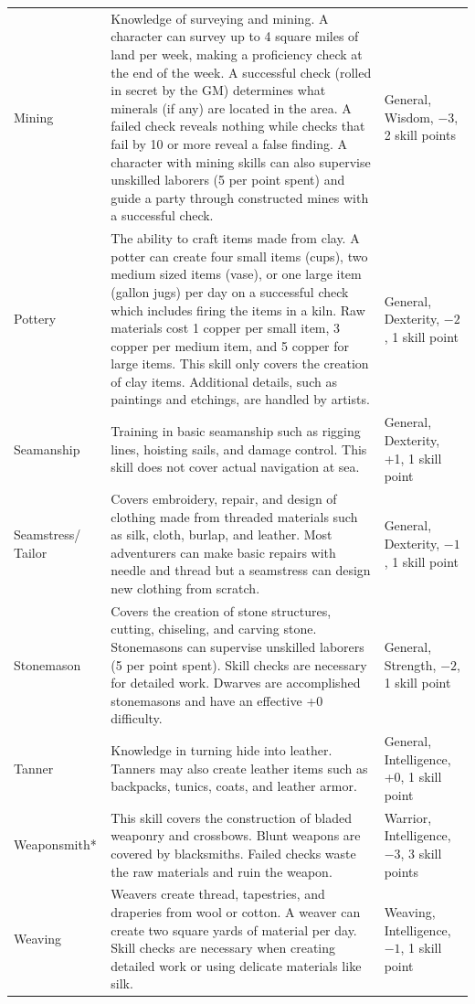\begin{longtable}{|p{}|p{}|p{}|}
\rowcolor[gray]{.9}Mining	& Knowledge of surveying and mining.  A character can survey up to 4 square miles of land per week, making a proficiency check at the end of the week.  A successful check (rolled in secret by the GM) determines what minerals (if any) are located in the area.  A failed check reveals nothing while checks that fail by 10 or more reveal a false finding.  A character with mining skills can also supervise unskilled laborers (5 per point spent) and guide a party through constructed mines with a successful check.	& General, Wisdom, $-3$, 2 skill points \\
Pottery	& The ability to craft items made from clay.  A potter can create four small items (cups), two medium sized items (vase), or one large item (gallon jugs) per day on a successful check which includes firing the items in a kiln.  Raw materials cost 1 copper per small item, 3 copper per medium item, and 5 copper for large items.  This skill only covers the creation of clay items.  Additional details, such as paintings and etchings, are handled by artists. 	& General, Dexterity, $-2$, 1 skill point \\
\rowcolor[gray]{.9}Seamanship	& Training in basic seamanship such as rigging lines, hoisting sails, and damage control.  This skill does not cover actual navigation at sea.  	& General, Dexterity, +1, 1 skill point \\
Seamstress/ Tailor	& Covers embroidery, repair, and design of clothing made from threaded materials such as silk, cloth, burlap, and leather.  Most adventurers can make basic repairs with needle and thread but a seamstress can design new clothing from scratch.   	& General, Dexterity, $-1$, 1 skill point \\
\rowcolor[gray]{.9}Stonemason	& Covers the creation of stone structures, cutting, chiseling, and carving stone.  Stonemasons can supervise unskilled laborers (5 per point spent).  Skill checks are necessary for detailed work.  Dwarves are accomplished stonemasons and have an effective +0 difficulty. & 	General, Strength, $-2$, 1 skill point \\
Tanner	& Knowledge in turning hide into leather.  Tanners may also create leather items such as backpacks, tunics, coats, and leather armor.	& General, Intelligence, +0, 1 skill point \\
\rowcolor[gray]{.9}Weapon\-smith*	& This skill covers the construction of bladed weaponry and crossbows.  Blunt weapons are covered by blacksmiths.  Failed checks waste the raw materials and ruin the weapon.	& Warrior, Intelligence, $-3$, 3 skill points \\
Weaving	& Weavers create thread, tapestries, and draperies from wool or cotton.  A weaver can create two square yards of material per day.  Skill checks are necessary when creating detailed work or using delicate materials like silk.	& Weaving, Intelligence, $-1$, 1 skill point \\
\hline
\end{longtable}
